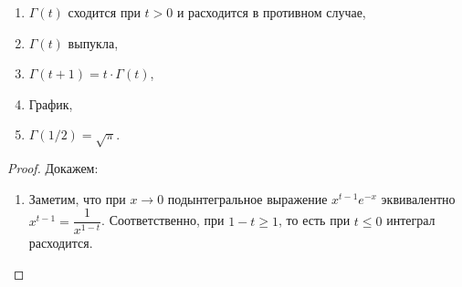 \begin{theorem} \hypertarget{t41}{}
	\begin{enumerate}
		\item \(\Gamma(t)\) сходится при \(t > 0\) и расходится в противном случае,
		\item \(\Gamma(t)\) выпукла,
		\item \(\Gamma(t + 1) = t \cdot \Gamma(t)\),%
		\item График,
		\item \(\Gamma(1/2) = \sqrt{\pi}\).
	\end{enumerate}
\end{theorem}
\begin{proof}
	Докажем:
	\begin{enumerate}
		\item Заметим, что при \(x \to 0\) подынтегральное выражение \(x^{t - 1} e^{-x}\) эквивалентно \(x^{t - 1} = \dfrac{1}{x^{1 - t}}\). Соответственно, при \(1 - t \geqslant 1\), то есть при \(t \leqslant 0\) интеграл расходится.
		

\end{enumerate}
\end{proof}
